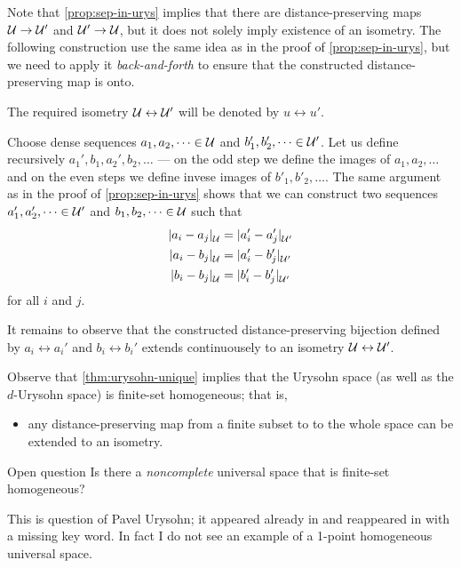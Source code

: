 Note that \ref{prop:sep-in-urys} implies that there are distance-preserving maps $\mathcal{U}\to \mathcal{U}'$ and $\mathcal{U}'\to \mathcal{U}$,
but it does not solely imply existence of an isometry.
The following construction use the same idea as in the proof of \ref{prop:sep-in-urys}, but we need to apply it \emph{back-and-forth} to ensure that the constructed distance-preserving map is onto.

The required isometry $\mathcal{U}\leftrightarrow \mathcal{U}'$ will be denoted by $u \leftrightarrow u'$.

Choose dense sequences $a_1,a_2,\dots\in \mathcal{U}$ and $b'_1,b'_2,\dots\in \mathcal{U}'$.
Let us define recursively $a_1',b_1, a_2', b_2,\dots$ --- on the odd step we define the images of $a_1,a_2,\dots$ and on the even steps we define invese images of $b'_1,b'_2,\dots$.
The same argument as in the proof of \ref{prop:sep-in-urys} shows that we can construct two sequences $a_1',a_2',\dots\in \mathcal{U}'$ and $b_1,b_2,\dots\in \mathcal{U}$ such that
\begin{align*}
\dist{a_i}{a_j}{\spc{U}}&=\dist{a_i'}{a_j'}{\spc{U}'}
\\
\dist{a_i}{b_j}{\spc{U}}&=\dist{a_i'}{b_j'}{\spc{U}'}
\\
\dist{b_i}{b_j}{\spc{U}}&=\dist{b_i'}{b_j'}{\spc{U}'}
\end{align*}
for all $i$ and $j$.

It remains to observe that the constructed distance-preserving bijection defined by $a_i\leftrightarrow a_i'$ and $b_i\leftrightarrow b_i'$ extends
continuousely to an isometry $\mathcal{U}\leftrightarrow \mathcal{U}'$. 
\qeds

Observe that \ref{thm:urysohn-unique} implies that the Urysohn space (as well as the $d$-Urysohn space) is finite-set homogeneous; that is,
\begin{itemize}
 \item any distance-preserving map from a finite subset to to the whole space can be extended to an isometry.
\end{itemize}

\begin{thm}{Open question}
Is there a \emph{noncomplete} universal space that is finite-set homogeneous?
\end{thm}

This is question of Pavel Urysohn; it appeared already in \cite[\S2(6)]{urysohn} and reappeared in \cite[p. 83]{gromov-2007} with a missing key word.
In fact I do not see an example of a 1-point homogeneous universal space.

